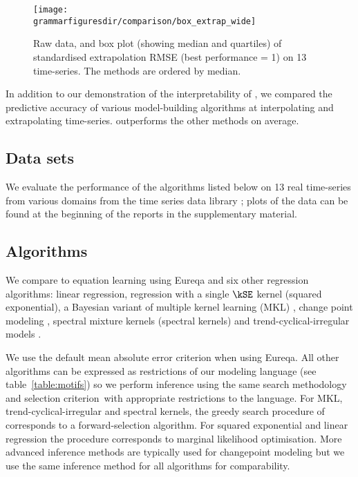 \begin{figure}[ht]
\centering
\texttt{[image: \\grammarfiguresdir/comparison/box\_extrap\_wide]}
\vspace{-0.8cm}
\caption[Comparision of extrapolation error of all methods on 13 time-series datasets.]
{Raw data, and box plot (showing median and quartiles) of standardised extrapolation RMSE (best performance = 1) on 13 time-series.
The methods are ordered by median.
}
\label{fig:box_extrap_dist}
\end{figure}

In addition to our demonstration of the interpretability of \procedurename{}, we compared the predictive accuracy of various model-building algorithms at interpolating and extrapolating time-series.
\procedurename{} outperforms the other methods on average.



\subsection{Data sets}

We evaluate the performance of the algorithms listed below on 13 real time-series from various domains from the time series data library \citep{TSDL}; plots of the data can be found at the beginning of the reports in the supplementary material.



\subsection{Algorithms}

We compare \procedurename{} to equation learning using Eureqa \citep{Eureqa} and six other regression algorithms: linear regression, \gp{} regression with a single $\kSE$ kernel (squared exponential), a Bayesian variant of multiple kernel learning (MKL) \citep[e.g.][]{bach2004multiple}, change point modeling \citep[e.g.][]{garnett2010sequential, saatcci2010gaussian, FoxDunson:NIPS2012}, spectral mixture kernels \citep{WilAda13} (spectral kernels) and trend-cyclical-irregular models \citep[e.g.][]{lind2006basic}.

We use the default mean absolute error criterion when using Eureqa.
All other algorithms can be expressed as restrictions of our modeling language (see table~\ref{table:motifs}) so we perform inference using the same search methodology and selection criterion\footnotemark~with appropriate restrictions to the language.
For MKL, trend-cyclical-irregular and spectral kernels, the greedy search procedure of \procedurename{} corresponds to a forward-selection algorithm.
For squared exponential and linear regression the procedure corresponds to marginal likelihood optimisation.
More advanced inference methods are typically used for changepoint modeling but we use the same inference method for all algorithms for comparability.

